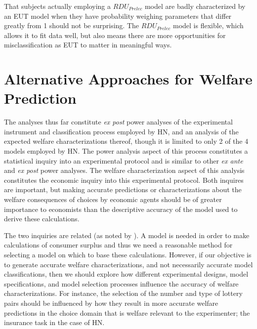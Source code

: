 \documentclass[../main.tex]{subfiles}
\begin{document}
That subjects actually employing a $\mathit{RDU_{Prelec}}$ model are badly characterized by an EUT model when they have probability weighing parameters that differ greatly from 1 should not be surprising.
The $\mathit{RDU_{Prelec}}$ model is flexible, which allows it to fit data well, but also means there are more opportunities for misclassification as EUT to matter in meaningful ways.

\section{Alternative Approaches for Welfare Prediction}

The analyses thus far constitute \textit{ex post} power analyses of the experimental instrument and classification process employed by HN, and an analysis of the expected welfare characterizations thereof, though it is limited to only 2 of the 4 models employed by HN.
The power analysis aspect of this process constitutes a statistical inquiry into an experimental protocol and is similar to other \textit{ex ante} and \textit{ex post} power analyses.
The welfare characterization aspect of this analysis constitutes the economic inquiry into this experimental protocol.
Both inquires are important, but making accurate predictions or characterizations about the welfare consequences of choices by economic agents should be of greater importance to economists than the descriptive accuracy of the model used to derive these calculations.{\footnotemark}

\addtocounter{footnote}{-1}

The two inquiries are related (as noted by \textcite[105]{Harrison2016}).
A model is needed in order to make calculations of consumer surplus and thus we need a reasonable method for selecting a model on which to base these calculations.
However, if our objective is to generate accurate welfare characterizations, and not necessarily accurate model classifications, then we should explore how different experimental designs, model specifications, and model selection processes influence the accuracy of welfare characterizations.
For instance, the selection of the number and type of lottery pairs should be influenced by how they result in more accurate welfare predictions in the choice domain that is welfare relevant to the experimenter; the insurance task in the case of HN.

\end{document}
